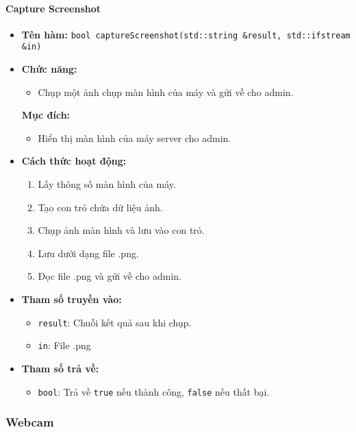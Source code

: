 \paragraph{Capture Screenshot}
\begin{itemize}
    \item \textbf{Tên hàm:} \texttt{bool captureScreenshot(std::string \&result, std::ifstream \&in)}
    \item \textbf{Chức năng:}
    \begin{itemize}
        \item Chụp một ảnh chụp màn hình của máy và gửi về cho admin.
    \end{itemize}
    \textbf{Mục đích:}
    \begin{itemize}
        \item Hiển thị màn hình của máy server cho admin.
    \end{itemize}
    \item \textbf{Cách thức hoạt động:}
    \begin{enumerate}
        \item Lấy thông số màn hình của máy.
        \item Tạo con trỏ chứa dữ liệu ảnh.
        \item Chụp ảnh màn hình và lưu vào con trỏ.
        \item Lưu dưới dạng file .png.
        \item Đọc file .png và gửi về cho admin.
    \end{enumerate}
    \item \textbf{Tham số truyền vào:}
    \begin{itemize}
        \item \texttt{result}: Chuỗi kết quả sau khi chụp.
        \item \texttt{in}: File .png
    \end{itemize}
    \item \textbf{Tham số trả về:}
    \begin{itemize}
        \item \texttt{bool}: Trả về \texttt{true} nếu thành công, \texttt{false} nếu thất bại.
    \end{itemize}
\end{itemize}

\subsubsection{Webcam}
\label{subsec:webcam}

